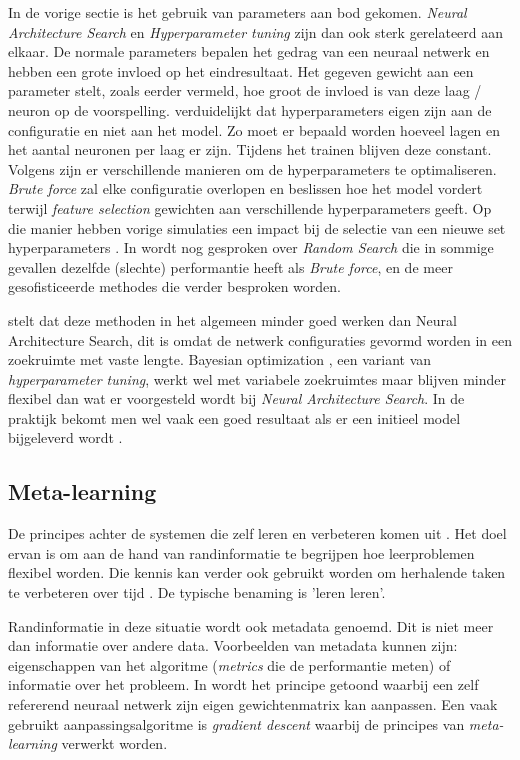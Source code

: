 In de vorige sectie is het gebruik van parameters aan bod gekomen. \textit{Neural Architecture Search} en \textit{Hyperparameter tuning} zijn dan ook sterk gerelateerd aan elkaar. De normale parameters bepalen het gedrag van een neuraal netwerk en hebben een grote invloed op het eindresultaat. Het gegeven gewicht aan een parameter stelt, zoals eerder vermeld, hoe groot de invloed is van deze laag / neuron op de voorspelling. \textcite{GoogleHT2020} verduidelijkt dat hyperparameters eigen zijn aan de configuratie en niet aan het model. Zo moet er bepaald worden hoeveel lagen en het aantal neuronen per laag er zijn. Tijdens het trainen blijven deze constant. Volgens \textcite{Brust2019} zijn er verschillende manieren om de hyperparameters te optimaliseren. \textit{Brute force} zal elke configuratie overlopen en beslissen hoe het model vordert terwijl \textit{feature selection} gewichten aan verschillende hyperparameters geeft. Op die manier hebben vorige simulaties een impact bij de selectie van een nieuwe set hyperparameters \autocite{Claesen2015}. In \textcite{Bergstra2011} wordt nog gesproken over \textit{Random Search} die in sommige gevallen dezelfde (slechte) performantie heeft als \textit{Brute force}, en de meer gesofisticeerde methodes die verder besproken worden. 

\textcite{ZophL2016} stelt dat deze methoden in het algemeen minder goed werken dan Neural Architecture Search, dit is omdat de netwerk configuraties gevormd worden in een zoekruimte met vaste lengte. Bayesian optimization \autocite{Bergstra2013}, een variant van \textit{hyperparameter tuning}, werkt wel met variabele zoekruimtes maar blijven minder flexibel dan wat er voorgesteld wordt bij \textit{Neural Architecture Search}. In de praktijk bekomt men wel vaak een goed resultaat als er een initieel model bijgeleverd wordt \autocite{ZophL2016}.

\subsection{Meta-learning}
\label{subsec:meta-learning}

De principes achter de systemen die zelf leren en verbeteren komen uit \textcite{Schmid1987}. Het doel ervan is om aan de hand van randinformatie te begrijpen hoe leerproblemen flexibel worden. Die kennis kan verder ook gebruikt worden om herhalende taken te verbeteren over tijd \autocite{ZophL2016}. De typische benaming is 'leren leren'.

Randinformatie in deze situatie wordt ook metadata genoemd. Dit is niet meer dan informatie over andere data. Voorbeelden van metadata kunnen zijn: eigenschappen van het algoritme (\textit{metrics} die de performantie meten) of informatie over het probleem. In \textcite{Schmidhuber1993} wordt het principe getoond waarbij een zelf refererend neuraal netwerk zijn eigen gewichtenmatrix kan aanpassen. Een vaak gebruikt aanpassingsalgoritme is \textit{gradient descent} waarbij de principes van \textit{meta-learning} verwerkt worden.

